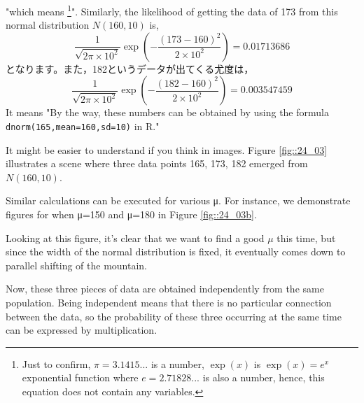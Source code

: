 \documentclass{ltjsbook}
\begin{document}
"which means \footnote{Just to confirm, $\pi=3.1415...$ is a number, $\exp(x)$ is $\exp(x)= e^x$ exponential function where $e = 2.71828...$ is also a number, hence, this equation does not contain any variables.}".
Similarly, the likelihood of getting the data of 173 from this normal distribution $N(160,10)$ is,
\[ \frac{1}{\sqrt{2\pi \times 10^2}} \exp\left(-\frac{(173-160)^2}{2\times 10^2}\right) = 0.01713686 \]
となります。また，182というデータが出てくる尤度は，
\[ \frac{1}{\sqrt{2\pi \times 10^2}} \exp\left(-\frac{(182-160)^2}{2\times 10^2}\right) = 0.003547459 \]
It means "By the way, these numbers can be obtained by using the formula \texttt{dnorm(165,mean=160,sd=10)} in R."

It might be easier to understand if you think in images. Figure \ref{fig::24_03} illustrates a scene where three data points 165, 173, 182 emerged from $N(160,10)$.


Similar calculations can be executed for various μ. For instance, we demonstrate figures for when μ=150 and μ=180 in Figure \ref{fig::24_03b}.


Looking at this figure, it's clear that we want to find a good $\mu$ this time, but since the width of the normal distribution is fixed, it eventually comes down to parallel shifting of the mountain.

Now, these three pieces of data are obtained independently from the same population. Being independent means that there is no particular connection between the data, so the probability of these three occurring at the same time can be expressed by multiplication.
\end{document}
